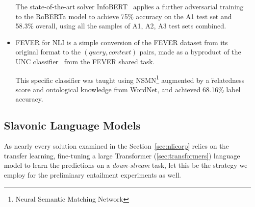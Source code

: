 \begin{itemize}
    The state-of-the-art solver \textsf{InfoBERT}~\cite{infobert} applies a further adversarial training to the \textsf{RoBERTa} model to achieve 75\% accuracy on the \textsf{A1} test set and 58.3\% overall, using all the samples of \textsf{A1}, \textsf{A2}, \textsf{A3} test sets combined.
    \item {\techbf FEVER for NLI} is a simple conversion of the \textsf{FEVER} dataset from its original format to the $(query,context)$ pairs, made as a byproduct of the UNC classifier~\cite{nie2019combining} from the \textsf{FEVER} shared task.
    
    This specific classifier was taught using NSMN\footnote{Neural Semantic Matching Network} augmented by a \"{relatedness} score and ontological knowledge from \textsf{WordNet}, and achieved  68.16\% label accuracy. 
\end{itemize}

\subsection{Slavonic Language Models}
As nearly every solution examined in the Section~\ref{sec:nlicorp} relies on the transfer learning, fine-tuning a large Transformer (\ref{sec:transformers}) language model to learn the predictions on a \textit{down-stream} task, let this be the strategy we employ for the preliminary entailment experiments as well.

